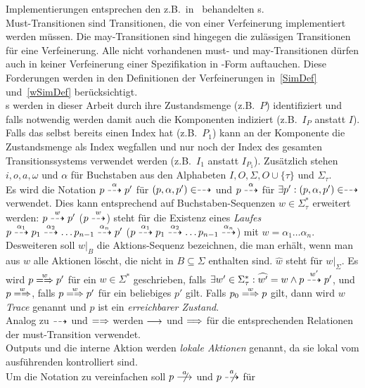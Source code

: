 Implementierungen entsprechen den z.B.\ in~\cite{Schinko2016BA} behandelten
\EIO{}s.\\
Must-Transitionen sind Transitionen, die von einer Verfeinerung implementiert
werden müssen. Die may-Transitionen sind hingegen die zulässigen Transitionen
für eine Verfeinerung. Alle nicht vorhandenen must- und may-Transitionen dürfen
auch in keiner Verfeinerung einer Spezifikation in \MEIO{}-Form auftauchen.
Diese Forderungen werden in den Definitionen der Verfeinerungen in~\ref{SimDef}
und~\ref{wSimDef} berücksichtigt.\\
\MEIO{}s  werden in dieser Arbeit durch ihre Zustandsmenge (z.B.\ $P$)
identifiziert und falls notwendig werden damit auch die Komponenten indiziert
(z.B.\ $I_P$ anstatt $I$). Falls das \MEIO{} selbst bereits einen Index hat
(z.B.\ $P_1$) kann an der Komponente die Zustandsmenge als Index wegfallen und
nur noch der Index des gesamten Transitionssystems verwendet werden (z.B.\
$I_1$ anstatt $I_{P_1}$). Zusätzlich stehen $i,o,a,\omega$ und $\alpha$ für
Buchstaben aus den Alphabeten $I,O,\Sigma ,O\cup\{\tau\}$ und $\Sigma_\tau$.\\
Es wird die Notation $p\may[\alpha] p'$ für $(p,\alpha,p')\in\may$ und
$p\may[\alpha]$ für $\exists p':(p,\alpha,p')\in\may$ verwendet. Dies kann
entsprechend auf Buchstaben-Sequenzen $w\in\Sigma_{\tau}^*$ erweitert werden:
$p\may[w]p'$ ($p\may[w]$) steht für die Existenz eines \emph{Laufes}
$p\may[\alpha _1]p_1\may[\alpha _2]\dots p_{n-1}\may[\alpha _n] p'$
($p\may[\alpha _1] p_1 \may[\alpha _2]\dots p_{n-1}\may[\alpha _n]$) mit
$w=\alpha _1\dots \alpha _n$.\\
Desweiteren soll $w|_B$ die Aktions-Sequenz bezeichnen, die man erhält, wenn
man aus $w$ alle Aktionen löscht, die nicht in $B\subseteq\Sigma$ enthalten
sind. $\widehat{w}$ steht für $w|_{\Sigma}$. Es wird $p\weakmay[w] p'$
für ein $w\in\Sigma ^*$ geschrieben, falls $\exists
w'\in\Sigma_{\tau}^*:\widehat{w'}=w\land p\may[w']p'$, und $p\weakmay[w]$,
falls $p\weakmay[w] p'$ für ein beliebiges $p'$ gilt. Falls $p_0\weakmay[w] p$
gilt, dann wird $w$ \emph{Trace} genannt und $p$ ist ein \emph{erreichbarer
Zustand}.\\
Analog zu $\may$ und $\weakmay$ werden $\must$ und $\weakmust$ für die
entsprechenden Relationen der must-Transition verwendet.\\
Outputs und die interne Aktion werden \emph{lokale Aktionen} genannt, da sie
lokal vom ausführenden \MEIO{} kontrolliert sind.\\
Um die Notation zu vereinfachen soll $p\nmust[a]$ und $p\nmay[a]$ für
